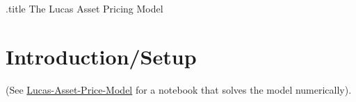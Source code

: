 \documentclass{\handout}
\begin{document}



\handoutHeader

\begin{verbatimwrite}{\jobname.title}
The Lucas Asset Pricing Model
\end{verbatimwrite}

\handoutNameMake

\section{Introduction/Setup}

(See \href{https://econ-ark.org/materials/lucas-asset-price-model?launch}{Lucas-Asset-Price-Model} for a notebook that solves the model numerically).
\end{document}
